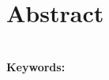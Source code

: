 \documentclass[../main.tex]{subfiles}
\begin{document}
\section{Abstract}

\blindtext\\

\noindent \textbf{Keywords:}
\end{document}
